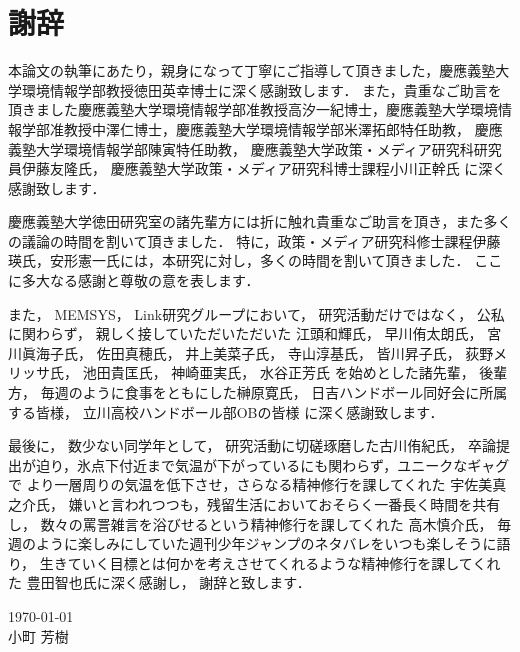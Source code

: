 \chapter*{謝辞}
本論文の執筆にあたり，親身になって丁寧にご指導して頂きました，慶應義塾大学環境情報学部教授徳田英幸博士に深く感謝致します．
また，貴重なご助言を頂きました慶應義塾大学環境情報学部准教授高汐一紀博士，慶應義塾大学環境情報学部准教授中澤仁博士，慶應義塾大学環境情報学部米澤拓郎特任助教，
慶應義塾大学環境情報学部陳寅特任助教，
慶應義塾大学政策・メディア研究科研究員伊藤友隆氏，
慶應義塾大学政策・メディア研究科博士課程小川正幹氏
に深く感謝致します．

慶應義塾大学徳田研究室の諸先輩方には折に触れ貴重なご助言を頂き，また多くの議論の時間を割いて頂きました．
特に，政策・メディア研究科修士課程伊藤瑛氏，安形憲一氏には，本研究に対し，多くの時間を割いて頂きました．
ここに多大なる感謝と尊敬の意を表します．

また，
MEMSYS，
Link研究グループにおいて，
研究活動だけではなく，
公私に関わらず，
親しく接していただいただいた
江頭和輝氏，
早川侑太朗氏，
宮川眞海子氏，
佐田真穂氏，
井上美菜子氏，
寺山淳基氏，
皆川昇子氏，
荻野メリッサ氏，
池田貴匡氏，
神崎亜実氏，
水谷正芳氏
を始めとした諸先輩，
後輩方，
毎週のように食事をともにした榊原寛氏，
日吉ハンドボール同好会に所属する皆様，
立川高校ハンドボール部OBの皆様
に深く感謝致します．

最後に，
数少ない同学年として，
研究活動に切磋琢磨した古川侑紀氏，
卒論提出が迫り，氷点下付近まで気温が下がっているにも関わらず，ユニークなギャグで
より一層周りの気温を低下させ，さらなる精神修行を課してくれた
宇佐美真之介氏，
嫌いと言われつつも，残留生活においておそらく一番長く時間を共有し，
数々の罵詈雑言を浴びせるという精神修行を課してくれた
高木慎介氏，
毎週のように楽しみにしていた週刊少年ジャンプのネタバレをいつも楽しそうに語り，
生きていく目標とは何かを考えさせてくれるような精神修行を課してくれた
豊田智也氏に深く感謝し，
謝辞と致します．




\begin{flushright}
\today\\
小町 芳樹
\end{flushright}
